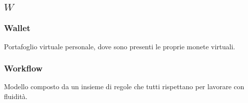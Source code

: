 \subsection*{\quad$W\quad$}
\subsubsection*{Wallet}
Portafoglio virtuale personale, dove sono presenti le proprie monete virtuali.

\subsubsection*{Workflow}
Modello composto da un insieme di regole che tutti rispettano per lavorare con fluidità.

